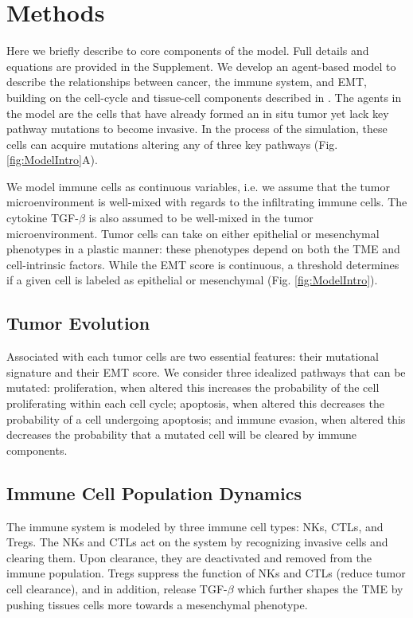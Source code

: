 \documentclass[11pt]{article}
\begin{document}
\section{Methods}
Here we briefly describe to core components of the model. Full details and equations are provided in the Supplement. We develop an agent-based model to describe the relationships between cancer, the immune system, and EMT, building on the cell-cycle and tissue-cell components described in \cite{guo17_multiscale}. 
The agents in the model are the cells that have already formed an in situ tumor yet lack key pathway mutations to become invasive.
In the process of the simulation, these cells can acquire mutations altering any of three key pathways (Fig. \ref{fig:ModelIntro}A).
\par
We model immune cells as continuous variables, i.e. we assume that the tumor microenvironment is well-mixed with regards to the infiltrating immune cells.
The cytokine TGF-$\beta$ is also assumed to be well-mixed in the tumor microenvironment.
Tumor cells can take on either epithelial or mesenchymal phenotypes in a plastic manner: these phenotypes depend on both the TME and cell-intrinsic factors.
While the EMT score is continuous, a threshold determines if a given cell is labeled as epithelial or mesenchymal (Fig. \ref{fig:ModelIntro}).

\subsection{Tumor Evolution}\label{TissueCells}
Associated with each tumor cells are two essential features: their mutational signature and their EMT score. We consider three idealized pathways that can be mutated: proliferation, when altered this increases the probability of the cell proliferating within each cell cycle; apoptosis, when altered this decreases the probability of a cell undergoing apoptosis; and immune evasion, when altered this decreases the probability that a mutated cell will be cleared by immune components.
 
\subsection{Immune Cell Population Dynamics}\label{ImmuneSystem}
The immune system is modeled by three immune cell types: NKs, CTLs, and Tregs.
The NKs and CTLs act on the system by recognizing invasive cells and clearing them.
Upon clearance, they are deactivated and removed from the immune population.
Tregs suppress the function of NKs and CTLs (reduce tumor cell clearance), and in addition, release TGF-$\beta$ which further shapes the TME by pushing tissues cells more towards a mesenchymal phenotype.
\end{document}
